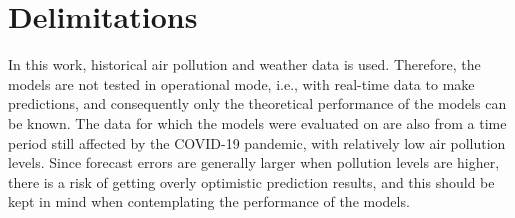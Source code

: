 




\section{Delimitations}
In this work, historical air pollution and weather data is used. Therefore, the models are not tested in operational mode, i.e., with real-time data to make predictions, and consequently only the theoretical performance of the models can be known. The data for which the models were evaluated on are also from a time period still affected by the COVID-19 pandemic, with relatively low air pollution levels. Since forecast errors are generally larger when pollution levels are higher, there is a risk of getting overly optimistic prediction results, and this should be kept in mind when contemplating the performance of the models. 


